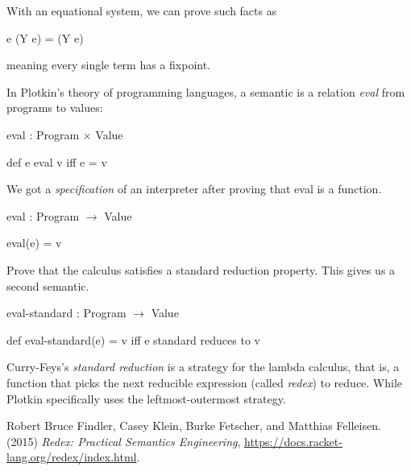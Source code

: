 With an equational system, we can prove such facts as

\centerline{e (Y e) = (Y e)}

meaning every single term has a fixpoint.

In Plotkin's theory of programming languages, a semantic is a relation
\textit{eval} from programs to values:

\centerline{eval : Program $\times$ Value}

\centerline{def e eval v iff e = v}

We got a \textit{specification} of an interpreter after proving that eval is a
function.

\centerline{eval : Program $\rightarrow$ Value}

\centerline{eval(e) = v}

Prove that the calculus satisfies a standard reduction property. This gives us a
second semantic.

\centerline{eval-standard : Program $\rightarrow$ Value}

\centerline{def eval-standard(e) = v iff e standard reduces to v}

Curry-Feys's \textit{standard reduction} is a strategy for the lambda calculus,
that is, a function that picks the next reducible expression (called
\textit{redex}) to reduce. While Plotkin specifically uses the
leftmost-outermost strategy.

\begin{thebibliography}{9}
Robert Bruce Findler, Casey Klein, Burke Fetscher, and Matthias Felleisen.
(2015) \emph{Redex: Practical Semantics Engineering},
\url{https://docs.racket-lang.org/redex/index.html}.
\end{thebibliography}
